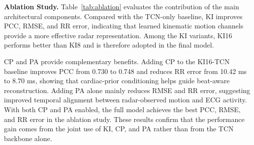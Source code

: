 \documentclass[runningheads]{llncs}
\begin{document}
\noindent\textbf{Ablation Study.}
Table~\ref{tab:ablation} evaluates the contribution of the main architectural components. Compared with the TCN-only baseline, KI improves PCC, RMSE, and RR error, indicating that learned kinematic motion channels provide a more effective radar representation. Among the KI variants, KI16 performs better than KI8 and is therefore adopted in the final model.

CP and PA provide complementary benefits. Adding CP to the KI16-TCN baseline improves PCC from 0.730 to 0.748 and reduces RR error from 10.42 ms to 8.70 ms, showing that cardiac-prior conditioning helps guide beat-aware reconstruction. Adding PA alone mainly reduces RMSE and RR error, suggesting improved temporal alignment between radar-observed motion and ECG activity. With both CP and PA enabled, the full model achieves the best PCC, RMSE, and RR error in the ablation study. These results confirm that the performance gain comes from the joint use of KI, CP, and PA rather than from the TCN backbone alone.
\end{document}
